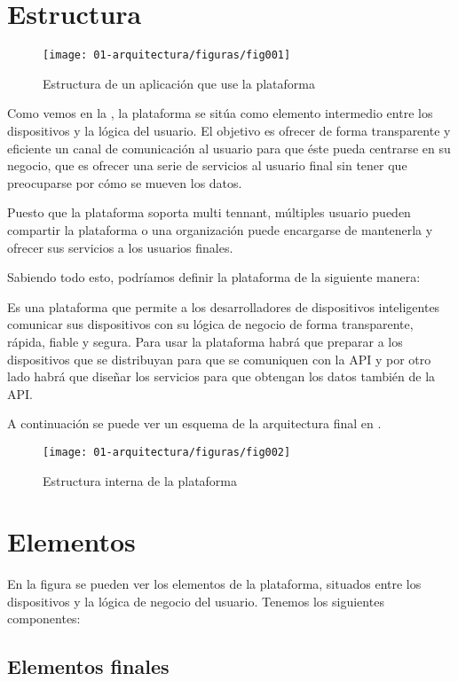 \section{Estructura}

\begin{figure}[htbp]
\centering
\texttt{[image: 01-arquitectura/figuras/fig001]}
\caption{Estructura de un aplicación que use la plataforma}
\label{fig:figura1}
\end{figure}

Como vemos en la , la plataforma se sitúa como elemento intermedio entre
los dispositivos y la lógica del usuario. El objetivo es ofrecer de forma
transparente y eficiente un canal de comunicación al usuario para que éste pueda
centrarse en su negocio, que es ofrecer una serie de servicios al usuario final
sin tener que preocuparse por cómo se mueven los datos.

Puesto que la plataforma soporta multi tennant, múltiples usuario pueden
compartir la plataforma o una organización puede encargarse de mantenerla y
ofrecer sus servicios a los usuarios finales.

Sabiendo todo esto, podríamos definir la plataforma de la siguiente manera:

Es una plataforma que permite a los desarrolladores de dispositivos inteligentes
comunicar sus dispositivos con su lógica de negocio de forma transparente,
rápida, fiable y segura.
Para usar la plataforma habrá que preparar a los dispositivos que se distribuyan
para que se comuniquen con la API y por otro lado habrá que diseñar los
servicios para que obtengan los datos también de la API.

A continuación se puede ver un esquema de la arquitectura final en .

\begin{figure}[htbp]
\centering
\texttt{[image: 01-arquitectura/figuras/fig002]}
\caption{Estructura interna de la plataforma}
\label{fig:figura2}
\end{figure}

\section{Elementos}

En la figura se pueden ver los elementos de la plataforma, situados entre los
dispositivos y la lógica de negocio del usuario. Tenemos los siguientes
componentes:

\subsection{Elementos finales}

